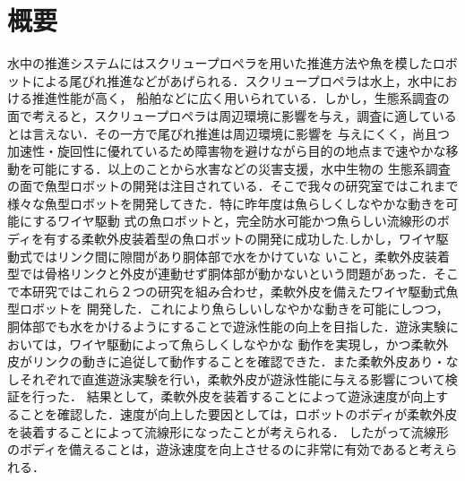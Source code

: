 \newpage
\section*{概要}
水中の推進システムにはスクリュープロペラを用いた推進方法や魚を模したロボットによる尾びれ推進などがあげられる．スクリュープロペラは水上，水中における推進性能が高く，
船舶などに広く用いられている．しかし，生態系調査の面で考えると，スクリュープロペラは周辺環境に影響を与え，調査に適しているとは言えない．その一方で尾びれ推進は周辺環境に影響を
与えにくく，尚且つ加速性・旋回性に優れているため障害物を避けながら目的の地点まで速やかな移動を可能にする．以上のことから水害などの災害支援，水中生物の
生態系調査の面で魚型ロボットの開発は注目されている．そこで我々の研究室ではこれまで様々な魚型ロボットを開発してきた．特に昨年度は魚らしくしなやかな動きを可能にするワイヤ駆動
式の魚ロボットと，完全防水可能かつ魚らしい流線形のボディを有する柔軟外皮装着型の魚ロボットの開発に成功した.しかし，ワイヤ駆動式ではリンク間に隙間があり胴体部で水をかけていな
いこと，柔軟外皮装着型では骨格リンクと外皮が連動せず胴体部が動かないという問題があった．そこで本研究ではこれら２つの研究を組み合わせ，柔軟外皮を備えたワイヤ駆動式魚型ロボットを
開発した．これにより魚らしいしなやかな動きを可能にしつつ，胴体部でも水をかけるようにすることで遊泳性能の向上を目指した．遊泳実験においては，ワイヤ駆動によって魚らしくしなやかな
動作を実現し，かつ柔軟外皮がリンクの動きに追従して動作することを確認できた．また柔軟外皮あり・なしそれぞれで直進遊泳実験を行い，柔軟外皮が遊泳性能に与える影響について検証を行った．
結果として，柔軟外皮を装着することによって遊泳速度が向上することを確認した．速度が向上した要因としては，ロボットのボディが柔軟外皮を装着することによって流線形になったことが考えられる．
したがって流線形のボディを備えることは，遊泳速度を向上させるのに非常に有効であると考えられる．